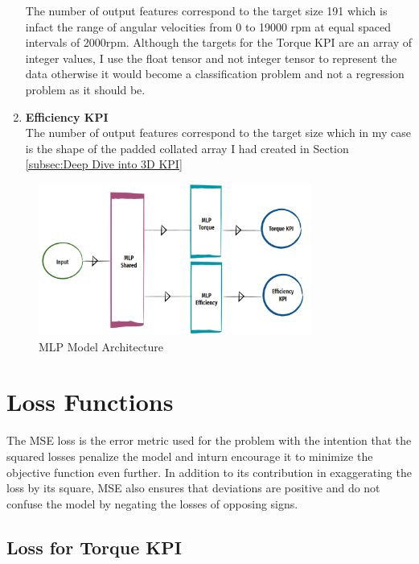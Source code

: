 \documentclass{report} %
\begin{document}
\begin{enumerate}
    The number of output features correspond to the target size 191 which is infact the range of angular velocities from 0 to 19000 rpm at equal spaced intervals of 2000rpm.
    Although the targets for the Torque \ac{KPI} are an array of integer values, I use the float tensor and not integer tensor to represent the data otherwise 
    it would become a classification problem and not a regression problem as it should be. 
    \item \textbf{Efficiency \ac{KPI}} \\
    The number of output features correspond to the target size which in my case is the shape of the padded collated array I had created in Section \ref{subsec:Deep Dive into 3D KPI}
\end{enumerate}

\begin{figure}[H]
    \centering
    \includegraphics[width=0.8\textwidth]{./ReportImages/mlp_architecture.png} 
    \caption{\ac{MLP} Model Architecture}
    \label{fig:MLP Model Architecture}
\end{figure}

\section{Loss Functions}\label{sec:Loss Functions}
The \ac{MSE} loss is the error metric used for the problem with the intention that the squared losses penalize the model and inturn encourage it to 
minimize the objective function even further. In addition to its contribution in exaggerating the loss by its square, \ac{MSE} also ensures that deviations are 
positive and do not confuse the model by negating the losses of opposing signs. 
\subsection{Loss for Torque KPI}\label{sec:Loss for 2D KPI}
\end{document}
